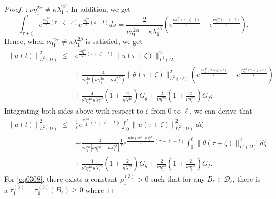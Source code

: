 \documentclass[oneside,preprint,12pt,numbers,sort&compress]{elsarticle}
\begin{document}
\begin{proof}
: $\nu\eta_1^{2\alpha} \neq \kappa\lambda_1^{2\beta}$. In addition, we get
\[
\int_{\tau+\zeta}^{t} e^{\frac{\kappa\lambda_{1}^{2\beta}}{2}(\tau+\zeta-s)} e^{\frac{\nu\eta_1^{2\alpha}}{2}(s-t)} ds = \frac{2}{\nu\eta_1^{2\alpha} - \kappa\lambda_1^{2\beta}} \left( e^{\frac{\kappa\lambda_1^{2\beta}(\tau + \zeta - t)}{2}} - e^{\frac{\nu\eta_1^{2\alpha}(\tau + \zeta - t)}{2}} \right).
\]
Hence, when  \(\nu\eta_1^{2\alpha} \neq \kappa\lambda_1^{2\beta}\) is satisfied, we get
\begin{equation}\label{eq0305}
\begin{aligned} 
   \|u(t)\|_{L^2(\Omega)}^2
   \leq 
   & e^{\frac{\nu\eta_1^{2\alpha}}{2}(\tau+\zeta-t)} \|u(\tau+\zeta)\|_{L^2(\Omega)}^2 
    \\
   &
   + \frac{4}{\nu\eta_1^{2\alpha}(\nu\eta_1^{2\alpha} - \kappa\lambda_1^{2\beta})} \|\theta(\tau+\zeta)\|_{L^2(\Omega)}^2 
   \left( e^{\frac{\kappa\lambda_1^{2\beta}(\tau + \zeta - t)}{2}} - e^{\frac{\nu\eta_1^{2\alpha}(\tau + \zeta - t)}{2}} \right) \\
   &
   + \frac{4}{\nu^{2}\eta_1^{4\alpha}\kappa\lambda_{1}^{2\beta}}
   \left(1+\frac{2}{\kappa\lambda_{1}^{2\beta}}\right)
   G_g
   + \frac{2}{\nu\eta_1^{2\alpha}} \left(1+\frac{2}{\nu\eta_1^{2\alpha}}\right)G_f;
\end{aligned}
\end{equation}
Integrating both sides above with respect to $\zeta$ from $0$ to $\ell$, we can derive that
\begin{equation}\label{eq0308}
\begin{aligned} 
   \|u(t)\|_{L^2(\Omega)}^2
   \leq 
   & \frac{1}{\ell} e^{\frac{\nu\eta_1^{2\alpha}}{2}(\tau+\ell-t)}  \int_{0}^{\ell} \|u(\tau+\zeta)\|_{L^2(\Omega)}^2 d\zeta
    \\
   &
   + \frac{4}{\nu\eta_1^{2\alpha}|\nu\eta_1^{2\alpha} - \kappa\lambda_1^{2\beta}|}  
   \frac{1}{\ell}
   e^{\frac{\min\{\nu\eta_1^{2\alpha},\kappa\lambda_1^{2\beta}\}}{2}(\tau+\ell-t)}
   \int_{0}^{\ell} 
   \|\theta(\tau+\zeta)\|_{L^2(\Omega)}^2  d\zeta \\
   &
   +\frac{4}{\nu^{2}\eta_1^{4\alpha}\kappa\lambda_{1}^{2\beta}}
   \left(1+\frac{2}{\kappa\lambda_{1}^{2\beta}}\right)
   G_g
   + \frac{2}{\nu\eta_1^{2\alpha}} \left(1+\frac{2}{\nu\eta_1^{2\alpha}}\right)G_f.
\end{aligned}
\end{equation}
For \cref{eq0308}, there exists a constant $\rho_{1}^{(3)} > 0$ such that for any $B_{\ell} \in \mathcal{D}_{\ell}$, there is a $\tau_{1}^{(3)} = \tau_{1}^{(3)}(B_{\ell}) \geq 0$ where  

\end{proof}
\end{document}
